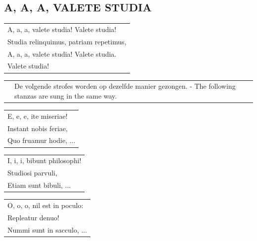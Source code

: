 \documentclass{article}
\begin{document}
\subsection*{A, A, A, VALETE STUDIA}
\begin{flushleft}
\begin{tabularx}{\textwidth} {
    >{\raggedright\arraybackslash}X}
A, a, a, valete studia! Valete studia!\\
Studia relinquimus, patriam repetimus,\\
A, a, a, valete studia! Valete studia.\\
Valete studia!\\
\end{tabularx}
\end{flushleft}
\begin{flushleft}
\begin{tabularx}{\textwidth} {
    c >{\raggedright\arraybackslash}X }
\hspace{5mm} & {\small De volgende strofes worden op dezelfde manier gezongen. - The following stanzas are sung in the same way.}\\
\end{tabularx}
\end{flushleft}
\begin{flushleft}
\begin{tabularx}{\textwidth} {
    >{\raggedright\arraybackslash}X}
E, e, e, ite miseriae!\\
Instant nobis feriae,\\
Quo fruamur hodie, ...\\
\end{tabularx}
\end{flushleft}
\begin{flushleft}
\begin{tabularx}{\textwidth} {
    >{\raggedright\arraybackslash}X}
I, i, i, bibunt philosophi!\\
Studiosi parvuli,\\
Etiam sunt bibuli, ...\\
\end{tabularx}
\end{flushleft}
\begin{flushleft}
\begin{tabularx}{\textwidth} {
    >{\raggedright\arraybackslash}X}
O, o, o, nil est in poculo:\\
Repleatur denuo!\\
Nummi sunt in sacculo, ...\\
\end{tabularx}
\end{flushleft}
\end{document}
